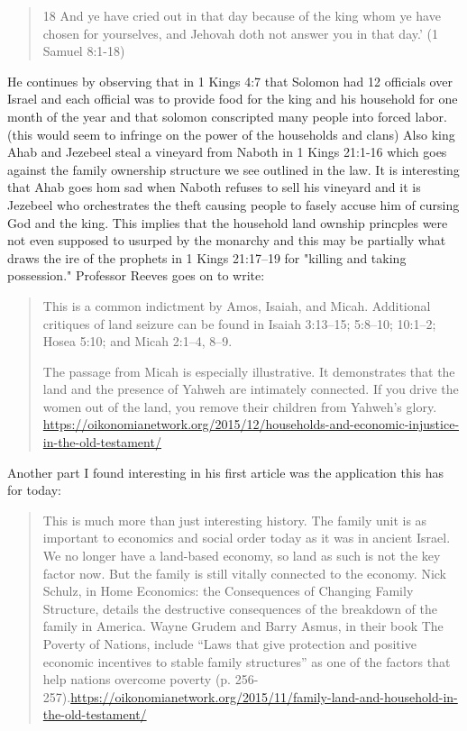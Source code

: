 \documentclass[11pt]{article}
\begin{document}
{\begin{quote}
18 And ye have cried out in that day because of the king whom ye have chosen for yourselves, and Jehovah doth not answer you in that day.' (1 Samuel 8:1-18)
\end{quote} 

He continues by observing that in 1 Kings 4:7 that Solomon had 12 officials over Israel and each official was to provide food for the king and his household for one month of the year and that solomon conscripted many people into forced labor. (this would seem to infringe on the power of the households and clans) Also king Ahab and Jezebeel steal a vineyard from Naboth in 1 Kings 21:1-16 which goes against the family ownership structure we see outlined in the law. It is interesting that Ahab goes hom sad when Naboth refuses to sell his vineyard and it is Jezebeel who orchestrates the theft causing people to fasely accuse him of cursing God and the king. This implies that the household land ownship princples were not even supposed to usurped by the monarchy and this may be partially what draws the ire of the prophets in 1 Kings 21:17–19 for "killing and taking possession." Professor Reeves goes on to write:
\begin{quote}
This is a common indictment by Amos, Isaiah, and Micah. Additional critiques of land seizure can be found in Isaiah 3:13–15; 5:8–10; 10:1–2; Hosea 5:10; and Micah 2:1–4, 8–9.

The passage from Micah is especially illustrative. It demonstrates that the land and the presence of Yahweh are intimately connected. If you drive the women out of the land, you remove their children from Yahweh’s glory. \url{https://oikonomianetwork.org/2015/12/households-and-economic-injustice-in-the-old-testament/}
\end{quote} 

Another part I found interesting in his first article was the application this has for today:
\begin{quote}
This is much more than just interesting history. The family unit is as important to economics and social order today as it was in ancient Israel. We no longer have a land-based economy, so land as such is not the key factor now. But the family is still vitally connected to the economy. Nick Schulz, in Home Economics: the Consequences of Changing Family Structure, details the destructive consequences of the breakdown of the family in America. Wayne Grudem and Barry Asmus, in their book The Poverty of Nations, include “Laws that give protection and positive economic incentives to stable family structures” as one of the factors that help nations overcome poverty (p. 256-257).\url{https://oikonomianetwork.org/2015/11/family-land-and-household-in-the-old-testament/}
\end{quote} 


}
\end{document}
